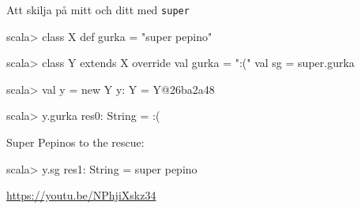 \begin{Slide}{Att skilja på mitt och ditt med \texttt{super}}
\begin{REPL}
scala> class X { def gurka = "super pepino" }

scala> class Y extends X {
         override val gurka = ":("
         val sg = super.gurka
       }

scala> val y = new Y
y: Y = Y@26ba2a48

scala> y.gurka
res0: String = :(
\end{REPL}

\pause
Super Pepinos to the rescue:
\begin{REPLnonum}
scala> y.sg
res1: String = super pepino

\end{REPLnonum}


\pause
{}
\href{https://youtu.be/NPhjiXskz34}{\small https://youtu.be/NPhjiXskz34}
\end{Slide}



